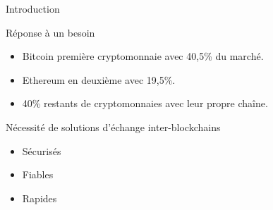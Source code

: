 \begin{frame}{Introduction}
\begin{block}{Réponse à un besoin}
    \begin{itemize}
    \item Bitcoin première cryptomonnaie avec 40,5\% du marché.
    \item Ethereum en deuxième avec 19,5\%.
    \item 40\% restants de cryptomonnaies avec leur propre chaîne.
\end{itemize}
\end{block}
\pause
\begin{block}{Nécessité de solutions d'échange inter-blockchains}
    \begin{itemize}
        \item Sécurisés
        \item Fiables
        \item Rapides
    \end{itemize}
\end{block}
\end{frame}

